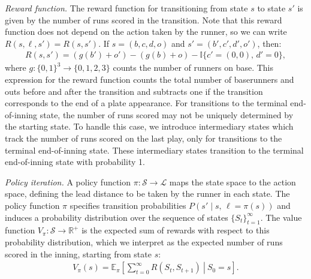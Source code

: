 \documentclass{article}
\begin{document}
        {\it Reward function.} The reward function for transitioning from state $s$ to state $s'$ is given by the number of runs scored in the transition. Note that this reward function does not depend on the action taken by the runner, so we can write $R(s, \ell, s') = R(s, s')$. If $s = (b, c, d, o)$ and $s' = (b', c', d', o')$, then:
        \begin{align}
          \label{eqn:reward}
          R(s, s') = (g(b') + o') - (g(b) + o) - \mathbb{I}\{c' = (0, 0),\, d' = 0\},
        \end{align}
        where $g: \{0, 1\}^3 \rightarrow \{0, 1, 2, 3\}$ counts the number of runners on base. This expression for the reward function counts the total number of baserunners and outs before and after the transition and subtracts one if the transition corresponds to the end of a plate appearance. For transitions to the terminal end-of-inning state, the number of runs scored may not be uniquely determined by the starting state. To handle this case, we introduce intermediary states which track the number of runs scored on the last play, only for transitions to the terminal end-of-inning state. These intermediary states transition to the terminal end-of-inning state with probability 1.

        {\it Policy iteration.} A policy function $\pi : \mathcal{S} \rightarrow \mathcal{L}$ maps the state space to the action space, defining the lead distance to be taken by the runner in each state. The policy function $\pi$ specifies transition probabilities $P(s' \mid s,\, \ell = \pi(s))$ and induces a probability distribution over the sequence of states $\{S_t\}_{t=1}^\infty$. The value function $V_\pi : \mathcal{S} \rightarrow \mathbb{R}^+$ is the expected sum of rewards with respect to this probability distribution, which we interpret as the expected number of runs scored in the inning, starting from state $s$:
        \begin{align}
          \label{eqn:run-expectancy}
          V_\pi(s) = \mathbb{E}_\pi\left[\left.\sum_{t = 0}^\infty R(S_{t}, S_{t+1})~\right|~S_0 = s\right].
        \end{align}
        
\end{document}
